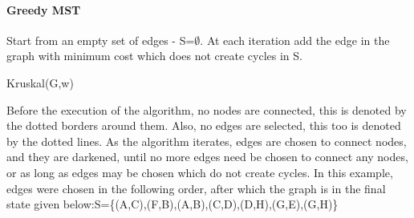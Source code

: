 \documentclass[12pt,letterpaper]{article}
\begin{document}
\paragraph{Greedy MST} Start from an empty set of edges - S=$\emptyset$. At each iteration add the edge in the graph with minimum cost which does not create cycles in S.
\begin{algorithm}
Kruskal(G,w)
\end{algorithm}
Before the execution of the algorithm, no nodes are connected, this is denoted by the dotted borders around them. Also, no edges are selected, this too is denoted by the dotted lines. As the algorithm iterates, edges are chosen to connect nodes, and they are darkened, until no more edges need be chosen to connect any nodes, or as long as edges may be chosen which do not create cycles. In this example, edges were chosen in the following order, after which the graph is in the final state given below:S=\{(A,C),(F,B),(A,B),(C,D),(D,H),(G,E),(G,H)\}
\end{document}
